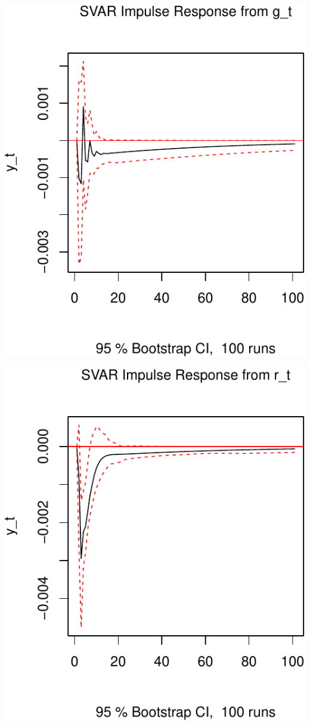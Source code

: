 \documentclass[11pt,preprint, authoryear]{elsarticle}
\numberwithin{equation}{section}
\numberwithin{figure}{section}
\numberwithin{table}{section}
\begin{document}
\includegraphics{TS_proj_files/figure-latex/unnamed-chunk-15-1.pdf}

\includegraphics{TS_proj_files/figure-latex/unnamed-chunk-16-1.pdf}
\end{document}
